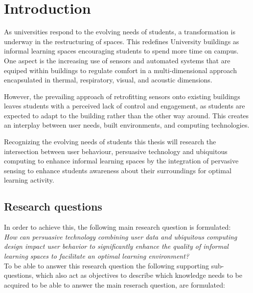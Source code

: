\section{Introduction}

As universities respond to the evolving needs of students, a transformation is underway in the restructuring of spaces. This redefines University buildings as informal learning spaces encouraging students to spend more time on campus. One aspect is the increasing use of sensors and automated systems that are equiped within buildings to regulate comfort in a multi-dimensional approach encapsulated in thermal, respiratory, visual, and acoustic dimensions.

However, the prevailing approach of retrofitting sensors onto existing buildings leaves students with a perceived lack of control and engagement, as students are expected to adapt to the building rather than the other way around. This creates an interplay between user needs, built environments, and computing technologies.

Recognizing the evolving needs of students this thesis will research the intersection between user behaviour, persuasive technology and ubiquitous computing to enhance informal learning spaces by the integration of pervasive sensing to enhance students awareness about their surroundings for optimal learning activity. 

\subsection{Research questions}

In order to achieve this, the following main research question is formulated: \\

\emph{How can persuasive technology combining user data and ubiquitous computing design impact user behavior to significantly enhance the quality of informal learning spaces to facilitate an optimal learning environment?} \\

To be able to answer this research question the following supporting sub-questions, which also act as objectives to describe which knowledge needs to be acquired to be able to answer the main reserach question, are formulated:

